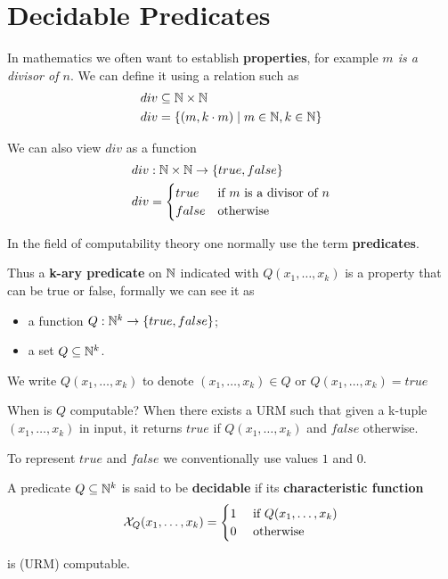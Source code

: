 \chapter{Decidable Predicates}

In mathematics we often want to establish \textbf{properties}, for example \emph{$m$ is a divisor of $n$}. 
We can define it using a relation such as
\begin{align*}
    div & \subseteq \mathbb{N} \times \mathbb{N}\\
    div & = \{(m,k \cdot m) \mid m \in \mathbb{N}, k \in \mathbb{N} \}
\end{align*}

We can also view $div$ as a function
\begin{align*}
    div & : \mathbb{N} \times \mathbb{N} \rightarrow \{true, false\}\\
    div & = \begin{cases}
                true & \mbox{if $m$ is a divisor of $n$}\\
                false & \mbox{otherwise}
            \end{cases}
\end{align*}

In the field of computability theory one normally use the term
\textbf{predicates}.

Thus a  \textbf{k-ary predicate} on $\mathbb{N} $ indicated with
$Q(x_1,\dots,x_k)$ is a property that can be true or false, formally
we can see it as

\begin{itemize}
\item a function $Q: \mathbb{N}^k\rightarrow \{true,false\}$;
\item a set $Q \subseteq \mathbb{N}^k$.
\end{itemize}

We write $Q(x_1,\dots,x_k)$ to denote $(x_1,\dots,x_k) \in Q$ or $Q(x_1,\dots,x_k) = true$

When is $Q$ computable? When there exists a URM such that given a k-tuple $(x_1,\dots,x_k)$ in input, it returns $true$ if $Q(x_1,\dots,x_k)$ and $false$ otherwise. 

To represent $\mathit{true}$ and $\mathit{false}$ we conventionally use values $1$ and $0$.

\begin{definition}
    A predicate $Q \subseteq \mathbb{N}^k$ is said to be \textbf{decidable} if its \textbf{characteristic function}
\begin{equation*}
\mathcal{X}_Q(x_1,\dots,x_k) = \begin{cases}
1 & $ if $ Q(x_1,\dots,x_k) \\
0 & $ otherwise $
\end{cases}
\end{equation*}

is (URM) computable.
\end{definition}



